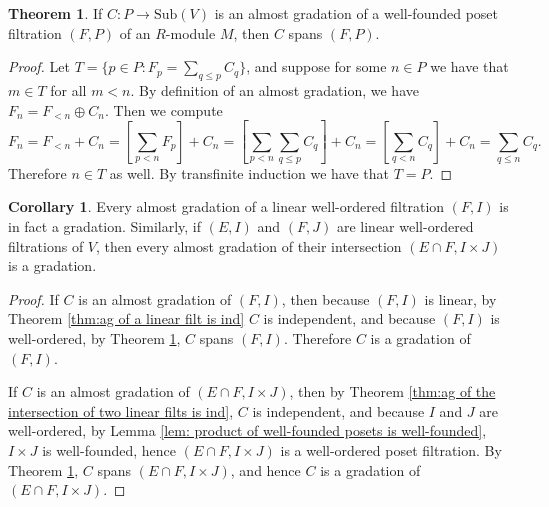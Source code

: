\documentclass[oneside,11pt]{amsart}
\newcommand{\Sub}{\ensuremath{\text{Sub}}}
\theoremstyle{definition}
\newtheorem{proof techniques}{Proof Techniques}
\newtheorem{corollary}{Corollary}
\newtheorem{theorem}{Theorem}
\begin{document}
\begin{theorem}\label{thm:ag of a well-founded poset filt spnas}
If $C: P \to \Sub(V)$ is an almost gradation of a well-founded poset filtration $(F, P)$ of an $R$-module $M$, then $C$ spans $(F , P)$.  
\end{theorem}

\begin{proof}
Let $T = \{ p \in P : F_p = \sum_{q \leq p} C_q \}$, and suppose for some $n \in P$ we have that $m \in T$ for all $m < n$. By definition of an almost gradation, we have $F_n = F_{<n} \oplus C_n$. Then we compute 
\begin{equation*}
F_n = F_{< n} + C_n = \left[ \sum_{p < n} F_p \right] + C_n = \left[ \sum_{p < n} \sum_{q \leq p} C_q \right] + C_n = \left[ \sum_{q < n} C_q \right] + C_n = \sum_{q \leq n} C_q. 
\end{equation*}
Therefore $n \in T$ as well. By transfinite induction we have that $T = P$. 
\end{proof}

\begin{corollary}\label{cor:every almost gradation of a well-ordered or product of well-ordered filtration is a gradation}
Every almost gradation of a linear well-ordered filtration $(F, I)$ is in fact a gradation. Similarly, if $(E , I)$ and $(F , J)$ are linear well-ordered filtrations of $V$, then every almost gradation of their intersection $(E \cap F , I \times J)$ is a gradation. 
\end{corollary}

\begin{proof}
If $C$ is an almost gradation of $(F , I)$, then because $(F , I)$ is linear, by Theorem \ref{thm:ag of a linear filt is ind} $C$ is independent, and because $(F , I)$ is well-ordered, by Theorem \ref{thm:ag of a well-founded poset filt spnas}, $C$ spans $(F , I)$. Therefore $C$ is a gradation of $(F , I)$. 

If $C$ is an almost gradation of $(E \cap F , I \times J)$, then by Theorem \ref{thm:ag of the intersection of two linear filts is ind}, $C$ is independent, and because $I$ and $J$ are well-ordered, by Lemma \ref{lem: product of well-founded posets is well-founded}, $I \times J$ is well-founded, hence $(E \cap F , I \times J)$ is a well-ordered poset filtration. By Theorem \ref{thm:ag of a well-founded poset filt spnas}, $C$ spans $(E \cap F , I \times J)$, and hence $C$ is a gradation of $(E \cap F , I \times J)$. 
\end{proof}
\end{document}
